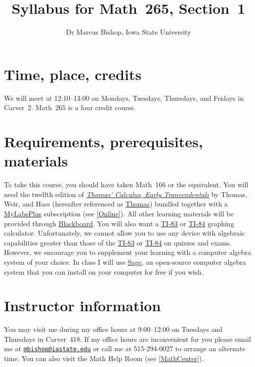 \documentclass[11pt]{article}
\title{Syllabus for Math~265, Section~1}
\author{Dr Marcus Bishop, Iowa State University}
\begin{document}
\maketitle

\section{Time, place, credits}\label{Time}
We will meet at 12:10--13:00
on Mondays, Tuesdays, Thursdays, and Fridays
in Carver~2.
Math~265 is a four credit course.

\section{Requirements, prerequisites, materials}\label{Require}
To take this course, you should have taken Math~166
or the equivalent. You will need the twelfth edition of 
\href{http://wps.aw.com/aw_thomas_calculus_series}
{\em Thomas' Calculus, Early Trancendentals}
by Thomas, Weir, and Hass (hereafter referenced as
\href{http://wps.aw.com/aw_thomas_calculus_series}{Thomas})
bundled together with a
\href{http://iastate.mylabsplus.com}{MyLabsPlus} subscription
(see \autoref{Online}).
All other learning materials will be provided through
\href{https://bb.its.iastate.edu}{Blackboard}.
You will also want a 
\href{http://en.wikipedia.org/wiki/TI-83}{TI-83} or
\href{http://en.wikipedia.org/wiki/TI-84}{TI-84}
graphing calculator. Unfortunately, we cannot allow you to use
any device with algebraic capabilities greater than those of the
\href{http://en.wikipedia.org/wiki/TI-83}{TI-83} or
\href{http://en.wikipedia.org/wiki/TI-84}{TI-84}
on quizzes and exams. However, we encourage
you to supplement your learning with a computer algebra system
of your choice.
In class I will use \href{http://www.sagemath.org}{\sf Sage},
an open-source computer algebra system that you can install on your
computer for free if you wish.

\section{Instructor information} You may visit me during my office 
hours at 9:00--12:00 on Tuesdays and Thursdays
in Carver~418. If my office hours are inconvenient for you
please email me at 
\href{mailto:mbishop@iastate.edu}{\tt mbishop@iastate.edu} or call me at 
515-294-0027 to arrange an alternate time.
You can also visit the Math Help Room (see \autoref{MathCenter}).
\end{document}

